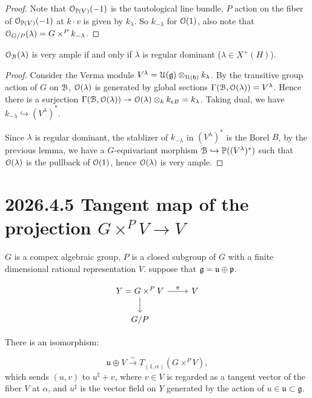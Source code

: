 \documentclass[12pt]{amsart}
\numberwithin{equation}{section}
\newcommand{\BP}{{\mathbb {P}}} \newcommand{\BQ}{{\mathbb {Q}}} \newcommand{\BR}{{\mathbb {R}}}
\newcommand{\fg}{\mathfrak{g}} \newcommand{\fh}{\mathfrak{h}} \newcommand{\fk}{\mathfrak{k}}
\newcommand{\fu}{\mathfrak{u}} \newcommand{\fv}{\mathfrak{v}} \newcommand{\fy}{\mathfrak{y}}
\renewcommand{\bar}{\overline}
\begin{document}
\begin{proof}
  Note that $\CO_{\BP(V)}(-1)$ is the tautological line bundle, $P$ action on the fiber of $\CO_{\BP(V)}(-1)$ at $k \cdot v$ is given by $k_{\lambda}$. So $k_{-\lambda}$ for ${\mathcal {O}}(1)$, also note that ${\mathcal {O}}_{G/P}(\lambda) = G \times^{P} k_{-\lambda}$.
\end{proof}

\begin{lem}
  ${\mathcal {O}}_{{\mathcal {B}}}(\lambda)$ is very ample if and only if $\lambda$ is regular dominant ($\lambda \in X^+(H)$).
\end{lem}

\begin{proof}
  Consider the Verma module $V^{\lambda} = \CU(\fg) \otimes_{\CU(\fh)} k_{\lambda}$. By the transitive group action of $G$ on ${\mathcal {B}}$, ${\mathcal {O}}(\lambda)$ is generated by global sections $\Gamma({\mathcal {B}},{\mathcal {O}}(\lambda)) = V^{\lambda}$. Hence there is a surjection $\Gamma({\mathcal {B}},{\mathcal {O}}(\lambda)) \twoheadrightarrow {\mathcal {O}}(\lambda) \otimes_k k_{eB} = k_{\lambda}$. Taking dual, we have $k_{-\lambda} \hookrightarrow (V^{\lambda})^*$.
  
  Since $\lambda$ is regular dominant, the stablizer of $k_{-\lambda}$ in $(V^{\lambda})^*$ is the Borel $B$, by the previous lemma, we have a $G$-equivariant morphism $\CB \hookrightarrow \BP((V^{\lambda})^*)$ such that ${\mathcal {O}}(\lambda)$ is the pullback of ${\mathcal {O}}(1)$, hence ${\mathcal {O}}(\lambda)$ is very ample.
\end{proof}





\section{2026.4.5 Tangent map of the projection $G \times^P V \to V$}
$G$ is a compex algebraic group, $P$ is a closed subgroup of $G$ with a finite dimensional rational representation $V$. suppose that $\fg = \fu \oplus \fp$.

\[
  \begin{tikzcd}
    Y = G \times^P V \arrow[r, "\pi"] \arrow[d] & V \\
    G/P & 
  \end{tikzcd}
\]

There is an isomorphism:

\[
  \fu \oplus V \xrightarrow{\sim} T_{\bar{(1,\alpha)}}(G \times^P V)  ,
\]
which sends $(u,v)$ to $u^{\sharp} + v$, where $v \in V$ is regarded as a tangent vector of the fiber $V$ at $\alpha$, and $u^{\sharp}$ is the vector field on $Y$ generated by the action of $u \in \fu \subset \fg$.
 
\end{document}
